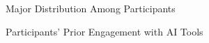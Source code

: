 \documentclass[12pt]{article}
\begin{document}
\begin{figure}[bht]
	\begin{center}
	{}
	\end{center}
	\vspace{-5mm} %
\caption{Major Distribution Among Participants}
\label{majors}
	\end{figure}

\begin{figure}[bht]
	\begin{center}
	{}
	\end{center}
	\vspace{-5mm} %
\caption{Participants' Prior Engagement with AI Tools}
	\label{previous engaement}
	\end{figure}
\end{document}
